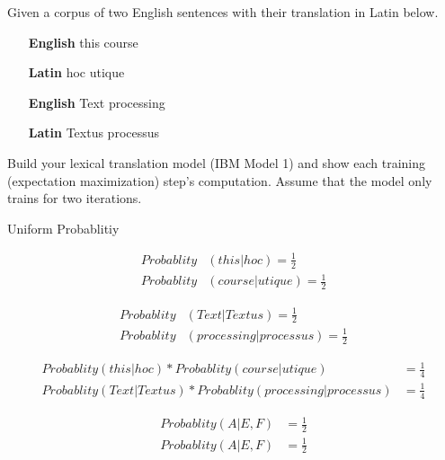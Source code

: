Given a corpus of two English sentences with their translation in Latin below.

\begin{itemize}
	\item [\textbf{English}] this course
	\item [\textbf{Latin}]   hoc utique
	\item [\textbf{English}] Text processing
	\item [\textbf{Latin}]   Textus processus
\end{itemize}

Build your lexical translation model (IBM Model 1) and show each training (expectation maximization) step’s computation. 
Assume that the model only trains for two iterations.
\begin{center}
	Uniform Probablitiy 
\end{center}
\begin{multicols}{2}
	\begin{align*}
		Probablity &(this|hoc) = \frac{1}{2} \\
		Probablity &(course|utique)= \frac{1}{2}
	\end{align*}

	\columnbreak

	\begin{align*}
		Probablity&(Text|Textus)= \frac{1}{2}\\
		Probablity&(processing|processus)= \frac{1}{2}
	\end{align*}
\end{multicols}

\begin{align*}
	Probablity (this|hoc)* Probablity (course|utique) &= \frac{1}{4}\\
		Probablity(Text|Textus)* Probablity(processing|processus)& = \frac{1}{4}
\end{align*}

\begin{align*}
	Probablity(A|E, F) &= \frac{1}{2}\\
	Probablity(A|E, F)&= \frac{1}{2}
\end{align*}
